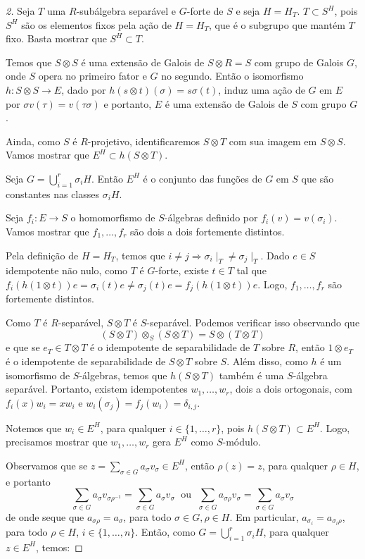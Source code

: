 \begin{teo}
\begin{proof}[2]\let\qed\relax
Seja $T$ uma $R$-subálgebra separável e $G$-forte de $S$ e seja $H=H_T$. $T\subset S^H$, pois $S^H$ são os elementos fixos pela ação de $H=H_T$, que é o subgrupo que mantém $T$ fixo. Basta mostrar que $S^H\subset T$. \par 
Temos que $S\otimes S$ é uma extensão de Galois de $S\otimes R = S$ com grupo de Galois $G$, onde $S$ opera no primeiro fator e $G$ no segundo. Então o isomorfismo $h: S\otimes S \rightarrow E$, dado por $h(s\otimes t)(\sigma)=s\sigma(t)$, induz uma ação de $G$ em $E$ por $\sigma v(\tau)=v(\tau\sigma)$ e portanto, $E$ é uma extensão de Galois de $S$ com grupo $G$. \par 
Ainda, como $S$ é $R$-projetivo, identificaremos $S\otimes T$ com sua imagem em $S\otimes S$. Vamos mostrar que $E^H \subset h(S\otimes T)$. \par
Seja $G=\bigcup_{i=1}^{r}\sigma_i H$. Então $E^H$ é o conjunto das funções de $G$ em $S$ que são constantes nas classes $\sigma_i H$. \par
Seja $f_i: E \rightarrow S$ o homomorfismo de $S$-álgebras definido por $f_i(v)=v(\sigma_i)$. Vamos mostrar que $f_1, \dots, f_r$ são dois a dois fortemente distintos. \par
Pela definição de $H=H_T$, temos que $i\neq j \Rightarrow \sigma_i\mid_T \neq \sigma_j \mid_T$. Dado $e \in S$ idempotente não nulo, como $T$ é $G$-forte, existe $t\in T$ tal que $f_i(h(1\otimes t))e = \sigma_i(t)e\neq\sigma_j(t)e=f_j(h(1\otimes t))e$. Logo, $f_1, \dots, f_r$ são fortemente distintos. \par
Como $T$ é $R$-separável, $S\otimes T$ é $S$-separável. Podemos verificar isso observando que\[(S\otimes T)\otimes_S (S\otimes T) = S\otimes (T\otimes T)\]e que se $e_T\in T \otimes T$ é o idempotente de separabilidade de $T$ sobre $R$, então $1\otimes e_T$ é o idempotente de separabilidade de $S\otimes T$ sobre $S$. Além disso, como $h$ é um isomorfismo de $S$-álgebras, temos que $h(S\otimes T)$ também é uma $S$-álgebra separável. Portanto, existem idempotentes $w_1, \dots, w_r$, dois a dois ortogonais, com $f_i(x)w_i=x w_i$ e $w_i(\sigma_j)=f_j(w_i)=\delta_{i,j}$. \par 
Notemos que $w_i \in E^H$, para qualquer $i\in \{1,\dots,r\}$, pois $h(S\otimes T) \subset E^H$. Logo, precisamos mostrar que $w_1,\dots,w_r$ gera $E^H$ como $S$-módulo. \par
Observamos que se $z=\sum_{\sigma \in G} a_\sigma v_\sigma \in E^H$, então $\rho(z)=z$, para qualquer $\rho \in H$, e portanto\[\sum_{\sigma \in G} a_\sigma v_{\sigma\rho^{-1}}=\sum_{\sigma \in G} a_\sigma v_\sigma \; \textrm{  ou  } \; \sum_{\sigma \in G} a_{\sigma\rho}v_{\sigma} = \sum_{\sigma \in G} a_\sigma v_\sigma\]de onde seque que $a_{\sigma\rho}=a_\sigma$, para todo $\sigma \in G, \rho \in H$. Em particular, $a_{\sigma_i}=a_{\sigma_i \rho}$, para todo $\rho \in H$, $i\in \{1,\dots, n\}$. Então, como $G=\bigcup_{i=1}^{r} \sigma_i H$, para qualquer $z\in E^H$, temos:

\end{proof}
\end{teo}
